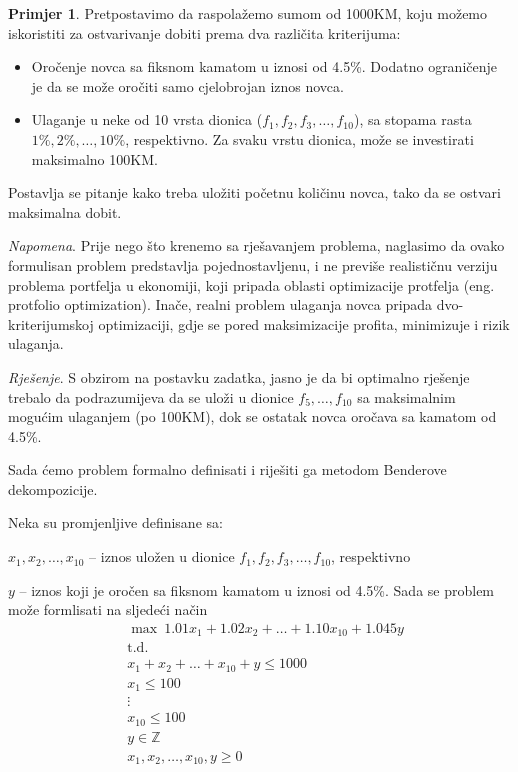 \documentclass[b5paper, utf8, 11pt, colorlinks]{book}
\theoremstyle{definition}
\newtheorem{primjer}{Primjer}[chapter]
\begin{document}
\begin{primjer} Pretpostavimo da raspolažemo sumom od 1000KM, koju možemo iskoristiti za ostvarivanje dobiti prema dva različita kriterijuma:
	\end{primjer}
\begin{itemize}
	\item Oročenje novca sa fiksnom kamatom u iznosi od 4.5\%. Dodatno ograničenje je da se može oročiti samo cjelobrojan iznos novca.
	
	\item Ulaganje u neke od 10 vrsta dionica ($f_1, f_2, f_3,\ldots,f_{10}$), sa stopama rasta $1\%,2\%,\ldots,10\%$, respektivno. Za svaku vrstu dionica, može se investirati maksimalno 100KM.
\end{itemize}
Postavlja se pitanje kako treba uložiti početnu količinu novca, tako da se ostvari maksimalna dobit.

\emph{Napomena}. Prije nego što krenemo sa rješavanjem problema, naglasimo da ovako formulisan problem predstavlja pojednostavljenu, i ne previše realističnu verziju problema portfelja u ekonomiji, koji pripada oblasti optimizacije protfelja (eng. protfolio optimization). Inače, realni problem ulaganja novca pripada dvo-kriterijumskoj optimizaciji, gdje se pored maksimizacije profita, minimizuje i rizik ulaganja.  

\emph{Rješenje}. S obzirom na postavku zadatka, jasno je da bi optimalno rješenje trebalo da podrazumijeva da se uloži u dionice $f_5,\ldots,f_{10}$ sa maksimalnim mogućim ulaganjem (po 100KM), dok se ostatak novca oročava sa kamatom od  4.5\%.

Sada ćemo problem formalno definisati i riješiti ga metodom Benderove dekompozicije.

Neka su promjenljive definisane sa:

$x_1,x_2,\ldots,x_{10}$ -- iznos uložen u dionice $f_1, f_2, f_3,\ldots,f_{10}$, respektivno

$y$ -- iznos koji je oročen sa fiksnom kamatom u iznosi od 4.5\%. Sada se problem može formlisati na sljedeći način
\begin{equation}\label{primer:formulacija1}
	\begin{aligned}
		&\max\ 1.01x_1+1.02x_2+\ldots+1.10x_{10}+1.045y\\
		&\mbox{t.d.}\\ 
		&x_1+x_2+\ldots+x_{10}+y\leqslant1000\\
		&x_1\leqslant 100\\
		&\vdots \\
		&x_{10}\leqslant 100\\
		&y\in \mathbb{Z}\\
		&x_1,x_2,\ldots,x_{10},y\geqslant 0
	\end{aligned}
\end{equation}
\end{document}
